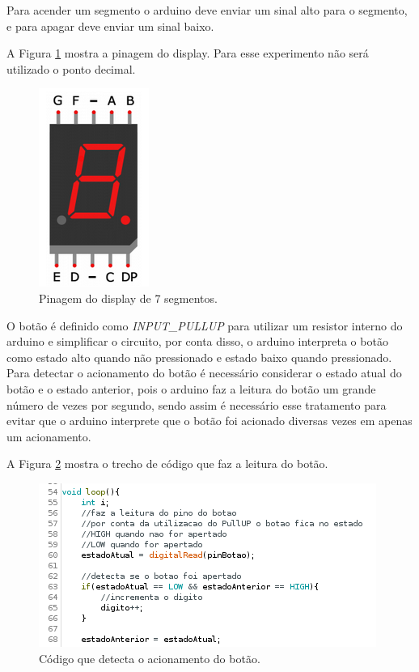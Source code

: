 \documentclass[12pt]{article}
\begin{document}
	Para acender um segmento o arduino deve enviar um sinal alto para o segmento, e para apagar deve enviar um sinal baixo.

	A Figura \ref{figPinosDisplay} mostra a pinagem do display. Para esse experimento não será utilizado o ponto decimal.

	\begin{figure}[h!]
		\centering
		\includegraphics[scale=0.5]{Imagens/Experimentos/4-Display7Seg/pinosDisplay.png}
		\caption{Pinagem do display de 7 segmentos.}
		\label{figPinosDisplay}
	\end{figure}

	O botão é definido como \textit{INPUT\_PULLUP} para utilizar um resistor interno do arduino e simplificar o circuito, por conta disso, o arduino interpreta o botão como estado alto quando não pressionado e estado baixo quando pressionado. Para detectar o acionamento do botão é necessário considerar o estado atual do botão e o estado anterior, pois o arduino faz a leitura do botão um grande número de vezes por segundo, sendo assim é necessário esse tratamento para evitar que o arduino interprete que o botão foi acionado diversas vezes em apenas um acionamento.

	A Figura \ref{figExp4botao} mostra o trecho de código que faz a leitura do botão.

	\begin{figure}[h!]
		\centering
		\includegraphics[scale=0.65]{Imagens/Experimentos/4-Display7Seg/codigoBotao.png}
		\caption{Código que detecta o acionamento do botão.}
		\label{figExp4botao}
	\end{figure}



\end{document}
